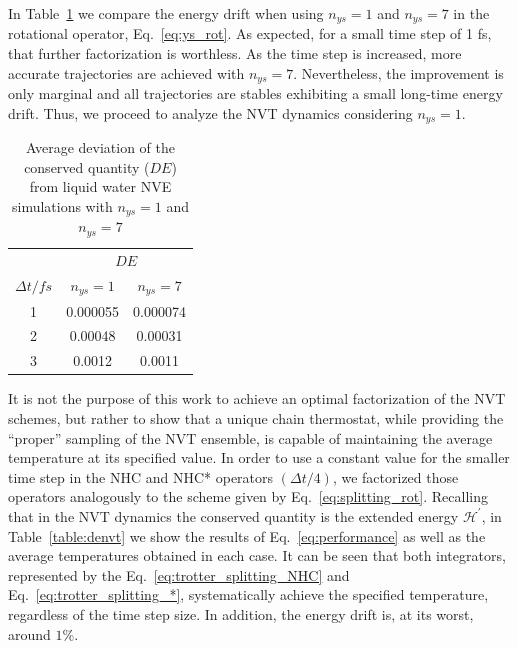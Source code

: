 \documentclass[aip,jcp,reprint,amsmath,amssymb,raggedbottom]{revtex4-1}
\begin{document}
In Table~\ref{table:nve} we compare the energy drift when using $n_{ys} = 1$ and $n_{ys} = 7$ in the rotational operator, Eq.~\ref{eq:ys_rot}. As expected, for a small time step of 1 fs, that further factorization is worthless. As the time step is increased, more accurate trajectories are achieved with $n_{ys} = 7 $. Nevertheless, the improvement is only marginal and all trajectories are stables exhibiting a small long-time energy drift. Thus, we proceed to analyze the NVT dynamics considering $n_{ys} = 1$.

\begin{table}[h]
\setlength{\tabcolsep}{7pt}
\caption{Average deviation of the conserved quantity ($DE$) from liquid water NVE simulations with $n_{ys}=1$ and $n_{ys}=7$  }
\centering %
\begin{tabular}{| c  c  c |}  
\hline
&  \multicolumn{2}{c|}{ $D E$ }\\
\cline{2-3}
$\Delta t/fs$ &$n_{ys}=1$ &$n_{ys}=7$ \\
\hline %
 1 & 0.000055 & 0.000074\\
 2 & 0.00048 & 0.00031 \\
 3 & 0.0012 & 0.0011\\
 \hline
\end{tabular}
\label{table:nve}
\end{table}

It is not the purpose of this work to achieve an optimal factorization of the NVT schemes, but rather to show that a unique chain thermostat, while providing the ``proper'' sampling of the NVT ensemble, is capable of maintaining the average temperature at its specified value. In order to use a constant value for the smaller time step in the NHC and NHC* operators $(\Delta t/4)$, we factorized those operators analogously to the scheme given by Eq.~\ref{eq:splitting_rot}. Recalling that in the NVT dynamics the conserved quantity is the extended energy $\mathcal{H}^\prime$, in Table~\ref{table:denvt} we show the results of Eq.~\ref{eq:performance} as well as the average temperatures obtained in each case. It can be seen that both integrators, represented by the Eq.~\ref{eq:trotter_splitting_NHC} and Eq.~\ref{eq:trotter_splitting_*}, systematically achieve the specified temperature, regardless of the time step size. In addition, the energy drift is, at its worst, around $1 \%$.
\end{document}
